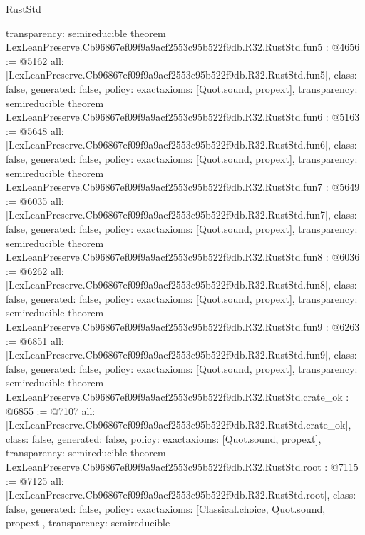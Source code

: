 \begin{lexlean}{RustStd}
\begin{coremodule}
{  transparency: semireducible
}
theorem LexLeanPreserve.Cb96867ef09f9a9acf2553c95b522f9db.R32.RustStd.fun5 : @4656 := @5162 {
  all: [LexLeanPreserve.Cb96867ef09f9a9acf2553c95b522f9db.R32.RustStd.fun5],
  class: false,
  generated: false,
  policy: exact{axioms: [Quot.sound, propext]},
  transparency: semireducible
}
theorem LexLeanPreserve.Cb96867ef09f9a9acf2553c95b522f9db.R32.RustStd.fun6 : @5163 := @5648 {
  all: [LexLeanPreserve.Cb96867ef09f9a9acf2553c95b522f9db.R32.RustStd.fun6],
  class: false,
  generated: false,
  policy: exact{axioms: [Quot.sound, propext]},
  transparency: semireducible
}
theorem LexLeanPreserve.Cb96867ef09f9a9acf2553c95b522f9db.R32.RustStd.fun7 : @5649 := @6035 {
  all: [LexLeanPreserve.Cb96867ef09f9a9acf2553c95b522f9db.R32.RustStd.fun7],
  class: false,
  generated: false,
  policy: exact{axioms: [Quot.sound, propext]},
  transparency: semireducible
}
theorem LexLeanPreserve.Cb96867ef09f9a9acf2553c95b522f9db.R32.RustStd.fun8 : @6036 := @6262 {
  all: [LexLeanPreserve.Cb96867ef09f9a9acf2553c95b522f9db.R32.RustStd.fun8],
  class: false,
  generated: false,
  policy: exact{axioms: [Quot.sound, propext]},
  transparency: semireducible
}
theorem LexLeanPreserve.Cb96867ef09f9a9acf2553c95b522f9db.R32.RustStd.fun9 : @6263 := @6851 {
  all: [LexLeanPreserve.Cb96867ef09f9a9acf2553c95b522f9db.R32.RustStd.fun9],
  class: false,
  generated: false,
  policy: exact{axioms: [Quot.sound, propext]},
  transparency: semireducible
}
theorem LexLeanPreserve.Cb96867ef09f9a9acf2553c95b522f9db.R32.RustStd.crate_ok : @6855 := @7107 {
  all: [LexLeanPreserve.Cb96867ef09f9a9acf2553c95b522f9db.R32.RustStd.crate_ok],
  class: false,
  generated: false,
  policy: exact{axioms: [Quot.sound, propext]},
  transparency: semireducible
}
theorem LexLeanPreserve.Cb96867ef09f9a9acf2553c95b522f9db.R32.RustStd.root : @7115 := @7125 {
  all: [LexLeanPreserve.Cb96867ef09f9a9acf2553c95b522f9db.R32.RustStd.root],
  class: false,
  generated: false,
  policy: exact{axioms: [Classical.choice, Quot.sound, propext]},
  transparency: semireducible
}


\end{coremodule}
\end{lexlean}
